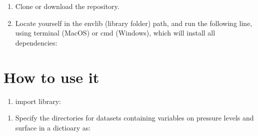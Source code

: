 \documentclass[a4paper,11pt,english]{sphinxmanual}
\begin{document}
\begin{sphinxVerbatim}[commandchars=\\\{\}]
    
  
  
  
\end{sphinxVerbatim}
\begin{enumerate}
%
\item {} 
Clone or download the repository.

\item {} 
Locate yourself in the envlib (library folder) path, and run the following line, using terminal (MacOS) or cmd (Windows), which will install all dependencies:

\end{enumerate}

\begin{sphinxVerbatim}[commandchars=\\\{\}]
  
\end{sphinxVerbatim}


\chapter{How to use it}
\label{\detokenize{index:how-to-use-it}}\begin{enumerate}
%
\item {} 
import library:

\end{enumerate}

\begin{sphinxVerbatim}[commandchars=\\\{\}]
 
   
\end{sphinxVerbatim}
\begin{enumerate}
%
\setcounter{enumi}{1}
\item {} 
Specify the directories for datasets containing variables on pressure levels and surface in a dictioary as:

\end{enumerate}
\end{document}
